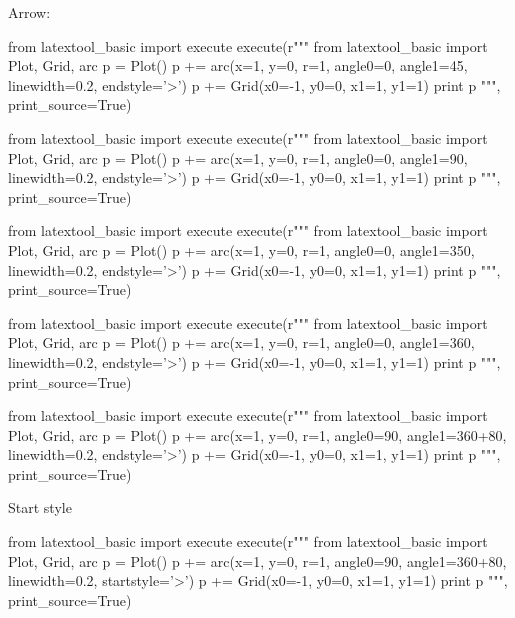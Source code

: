 Arrow:
\begin{python}
from latextool_basic import execute
execute(r"""
from latextool_basic import Plot, Grid, arc
p = Plot()
p += arc(x=1, y=0, r=1, angle0=0, angle1=45, 
        linewidth=0.2, endstyle='>')
p += Grid(x0=-1, y0=0, x1=1, y1=1)
print p
""", print_source=True)
\end{python}

\begin{python}
from latextool_basic import execute
execute(r"""
from latextool_basic import Plot, Grid, arc
p = Plot()
p += arc(x=1, y=0, r=1, angle0=0, angle1=90, 
        linewidth=0.2, endstyle='>')
p += Grid(x0=-1, y0=0, x1=1, y1=1)
print p
""", print_source=True)
\end{python}




\begin{python}
from latextool_basic import execute
execute(r"""
from latextool_basic import Plot, Grid, arc
p = Plot()
p += arc(x=1, y=0, r=1, angle0=0, angle1=350, 
        linewidth=0.2, endstyle='>')
p += Grid(x0=-1, y0=0, x1=1, y1=1)
print p
""", print_source=True)
\end{python}



\begin{python}
from latextool_basic import execute
execute(r"""
from latextool_basic import Plot, Grid, arc
p = Plot()
p += arc(x=1, y=0, r=1, angle0=0, angle1=360, 
        linewidth=0.2, endstyle='>')
p += Grid(x0=-1, y0=0, x1=1, y1=1)
print p
""", print_source=True)
\end{python}





\begin{python}
from latextool_basic import execute
execute(r"""
from latextool_basic import Plot, Grid, arc
p = Plot()
p += arc(x=1, y=0, r=1, angle0=90, angle1=360+80, 
        linewidth=0.2, endstyle='>')
p += Grid(x0=-1, y0=0, x1=1, y1=1)
print p
""", print_source=True)
\end{python}



Start style
\begin{python}
from latextool_basic import execute
execute(r"""
from latextool_basic import Plot, Grid, arc
p = Plot()
p += arc(x=1, y=0, r=1, angle0=90, angle1=360+80, 
        linewidth=0.2, startstyle='>')
p += Grid(x0=-1, y0=0, x1=1, y1=1)
print p
""", print_source=True)
\end{python}



